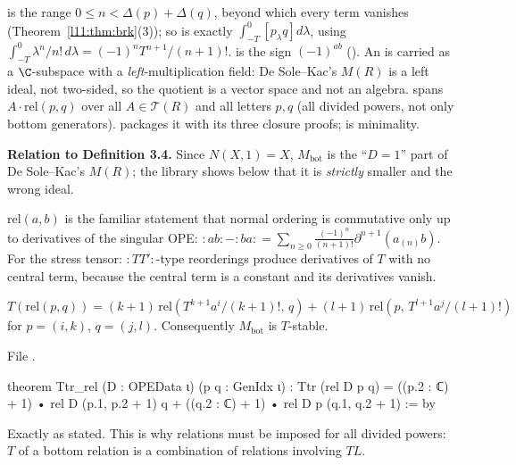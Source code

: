 \begin{dictionary}
\allowbreak{}\allowbreak{}\allowbreak{} is the range $0\le n<\Delta(p)+\Delta(q)$, beyond which every term vanishes
(Theorem~\ref{l11:thm:brk}(3)); so  is exactly $\int_{-T}^0[p_\lambda q]d\lambda$, using
$\int_{-T}^0\lambda^n/n!\,d\lambda = (-1)^nT^{n+1}/(n+1)!$.  is the sign $(-1)^{ab}$
(). An  is carried as a $\C$-subspace with a
\emph{left}-multiplication field: De Sole--Kac's $M(R)$ is a left ideal, not two-sided, so the quotient is a vector space and
not an algebra.  spans $A\cdot\mathrm{rel}(p,q)$ over all $A\in\mathcal T(R)$ and all letters $p,q$ (all divided
powers, not only bottom generators).  packages it with its three closure proofs;  is minimality.

\textbf{Relation to Definition 3.4.} Since $N(X,1) = X$, $M_{\mathrm{bot}}$ is the ``$D=1$'' part of De Sole--Kac's $M(R)$; the
library shows below that it is \emph{strictly} smaller and the wrong ideal.
\end{dictionary}

\begin{physics}
$\mathrm{rel}(a,b)$ is the familiar statement that normal ordering is commutative only up to derivatives of the singular OPE:
${:}ab{:}-{:}ba{:} = \sum_{n\ge0}\frac{(-1)^n}{(n+1)!}\partial^{n+1}(a_{(n)}b)$. For the stress tensor:
${:}TT'{:}$-type reorderings produce derivatives of $T$ with no central term, because the central term is a constant and its
derivatives vanish.
\end{physics}

\begin{theorem}\label{l11:thm:Trel}
$T(\mathrm{rel}(p,q)) = (k+1)\,\mathrm{rel}(T^{k+1}a^i/(k+1)!,\,q)+(l+1)\,\mathrm{rel}(p,\,T^{l+1}a^j/(l+1)!)$ for $p = (i,k)$,
$q = (j,l)$. Consequently $M_{\mathrm{bot}}$ is $T$-stable.
\end{theorem}
\noindent File .
\begin{leancode}
theorem Ttr_rel (D : OPEData ι) (p q : GenIdx ι) :
    Ttr (rel D p q)
      = ((p.2 : ℂ) + 1) • rel D (p.1, p.2 + 1) q
        + ((q.2 : ℂ) + 1) • rel D p (q.1, q.2 + 1) := by
\end{leancode}

\begin{dictionary}
Exactly as stated. This is why relations must be imposed for all divided powers: $T$ of a bottom relation is a combination of
relations involving $TL$.
\end{dictionary}

